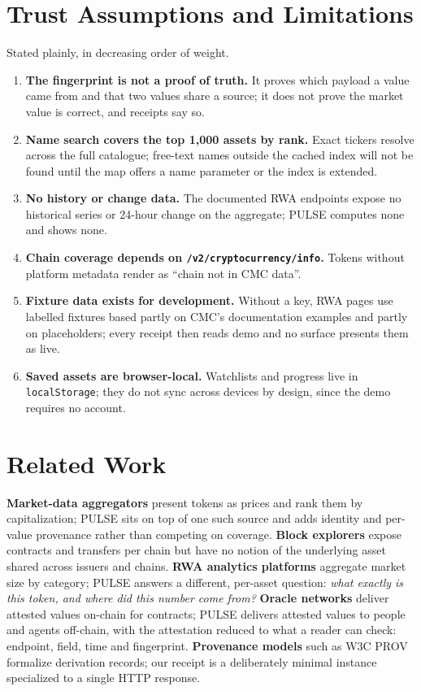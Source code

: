 \documentclass[11pt]{article}
\newcommand{\code}[1]{\texttt{\small #1}}
\begin{document}
\section{Trust Assumptions and Limitations}
Stated plainly, in decreasing order of weight.
\begin{enumerate}
\item \textbf{The fingerprint is not a proof of truth.} It proves which payload a value came from and that two values share a source; it does not prove the market value is correct, and receipts say so.
\item \textbf{Name search covers the top 1,000 assets by rank.} Exact tickers resolve across the full catalogue; free-text names outside the cached index will not be found until the map offers a name parameter or the index is extended.
\item \textbf{No history or change data.} The documented RWA endpoints expose no historical series or 24-hour change on the aggregate; \textsc{PULSE} computes none and shows none.
\item \textbf{Chain coverage depends on \code{/v2/cryptocurrency/info}.} Tokens without platform metadata render as ``chain not in CMC data''.
\item \textbf{Fixture data exists for development.} Without a key, RWA pages use labelled fixtures based partly on CMC's documentation examples and partly on placeholders; every receipt then reads \textsf{demo} and no surface presents them as live.
\item \textbf{Saved assets are browser-local.} Watchlists and progress live in \code{localStorage}; they do not sync across devices by design, since the demo requires no account.
\end{enumerate}

\section{Related Work}
\textbf{Market-data aggregators} present tokens as prices and rank them by capitalization; \textsc{PULSE} sits on top of one such source and adds identity and per-value provenance rather than competing on coverage. \textbf{Block explorers} expose contracts and transfers per chain but have no notion of the underlying asset shared across issuers and chains. \textbf{RWA analytics platforms} aggregate market size by category; \textsc{PULSE} answers a different, per-asset question: \emph{what exactly is this token, and where did this number come from?} \textbf{Oracle networks} deliver attested values on-chain for contracts; \textsc{PULSE} delivers attested values to people and agents off-chain, with the attestation reduced to what a reader can check: endpoint, field, time and fingerprint. \textbf{Provenance models} such as W3C PROV formalize derivation records; our receipt is a deliberately minimal instance specialized to a single HTTP response.
\end{document}
